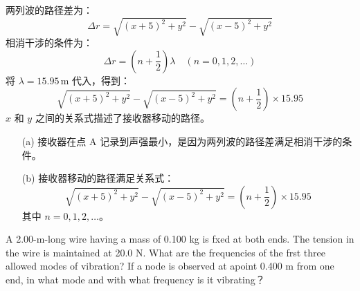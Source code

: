 \begin{solution}
	两列波的路径差为：
	\[
	\Delta r = \sqrt{(x + 5)^2 + y^2} - \sqrt{(x - 5)^2 + y^2}
	\]
	相消干涉的条件为：
	\[
	\Delta r = \left( n + \frac{1}{2} \right) \lambda \quad (n = 0, 1, 2, \dots)
	\]
	将 \( \lambda = 15.95 \, \text{m} \) 代入，得到：
	\[
	\sqrt{(x + 5)^2 + y^2} - \sqrt{(x - 5)^2 + y^2} = \left( n + \frac{1}{2} \right) \times 15.95
	\]
	\( x \) 和 \( y \) 之间的关系式描述了接收器移动的路径。

	\begin{itemize}
		\item[(a)] 接收器在点 A 记录到声强最小，是因为两列波的路径差满足相消干涉的条件。
		\item[(b)] 接收器移动的路径满足关系式：
		\[
		\sqrt{(x + 5)^2 + y^2} - \sqrt{(x - 5)^2 + y^2} = \left( n + \frac{1}{2} \right) \times 15.95
		\]
		其中 \( n = 0, 1, 2, \dots \)。
	\end{itemize}
\end{solution}

\begin{solution}[]
	A 2.00-m-long wire having a mass of 0.100 kg is fxed at both ends. The tension in the wire is maintained at 20.0 N. What are the frequencies of the frst three allowed modes of vibration? If a node is observed at apoint 0.400 m from one end, in what mode and with what frequency is it vibrating？

    \tcbrule
\end{solution}